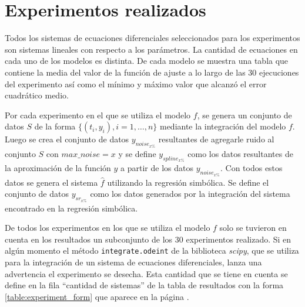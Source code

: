 \section{Experimentos realizados}\label{section:experiments}

Todos los sistemas de ecuaciones diferenciales seleccionados para los experimentos son sistemas lineales con respecto a los parámetros. La cantidad de ecuaciones en cada uno de los modelos es distinta. De cada modelo se muestra una tabla que contiene la media del valor de la función de ajuste a lo largo de las 30 ejecuciones del experimento así como el mínimo y máximo valor que alcanzó el error cuadrático medio.

Por cada experimento en el que se utiliza el modelo $f$, se genera un conjunto de datos $S$ de la forma $\{(t_i, y_i), i=1, \dots, n\}$ mediante la integración del modelo $f$. Luego se crea el conjunto de datos $y_{noise_{x\%}}$ resultantes de agregarle ruido al conjunto $S$ con $max\_noise=x$ y se define $y_{spline_{x\%}}$ como los datos resultantes de la aproximación de la función $y$ a partir de los datos $y_{noise_{x\%}}$. Con todos estos datos se genera el sistema $\hat{f}$ utilizando la regresión simbólica. Se define el conjunto de datos $y_{sr_{x\%}}$ como los datos generados por la integración del sistema encontrado en la regresión simbólica.


De todos los experimentos en los que se utiliza el modelo $f$ solo se tuvieron en cuenta en los resultados un subconjunto de los 30 experimentos realizado. Si en algún momento el método \texttt{integrate.odeint} de la biblioteca \emph{scipy}, que se utiliza para la integración de un sistema de ecuaciones diferenciales, lanza una advertencia el experimento se desecha. Esta cantidad que se tiene en cuenta se define en la fila ``cantidad de sistemas'' de la tabla de resultados con la forma \ref{table:experiment_form} que aparece en la página \pageref{table:experiment_form}.

